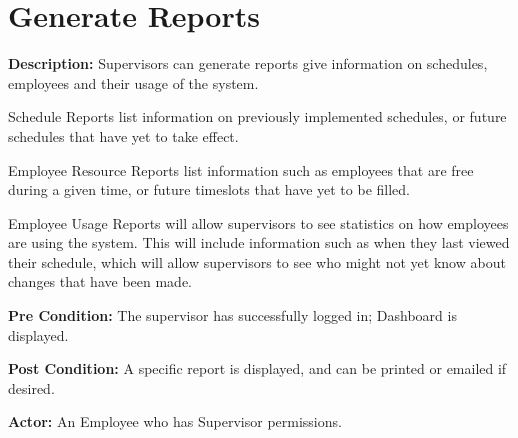 \documentclass[letterpaper,12pt]{report}
\begin{document}
\section{Generate Reports}
\begin{description}
 \item \textbf{Description:} \newline Supervisors can generate reports give information on schedules, employees and their usage of the system. 

Schedule Reports list information on previously implemented schedules, or future schedules that have yet to take effect.

Employee Resource Reports list information such as employees that are free during a given time, or future timeslots that have yet to be filled. 

Employee Usage Reports will allow supervisors to see statistics on how employees are using the system.  This will include information such as when they last viewed their schedule, which will allow supervisors to see who might not yet know about changes that have been made.

 \item \textbf{Pre Condition:} \newline The supervisor has successfully logged in; Dashboard is displayed.
 \item \textbf{Post Condition:} \newline A specific report is displayed, and can be printed or emailed if desired.
 \item \textbf{Actor:} \newline An Employee who has Supervisor permissions.
\end{description}
\end{document}
